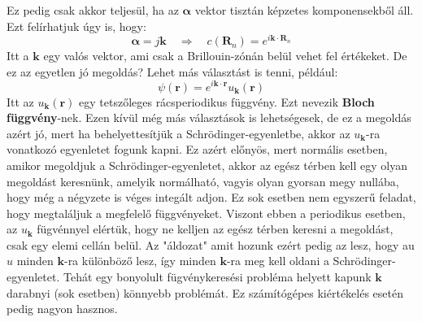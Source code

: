 \documentclass[../main.tex]{subfiles}
\begin{document}
Ez pedig csak akkor teljesül, ha az $\boldsymbol{\alpha}$ vektor tisztán képzetes komponensekből áll. Ezt felírhatjuk úgy is, hogy:
\begin{equation}
    \boldsymbol{\alpha} = j \mathbf{k} \quad \Rightarrow \quad c(\mathbf{R}_n) = e^{i \mathbf{k} \cdot \mathbf{R}_n}
\end{equation}
Itt a $\mathbf{k}$ egy valós vektor, ami csak a Brillouin-zónán belül vehet fel értékeket. De ez az egyetlen jó megoldás? Lehet más választást is tenni, például:
\begin{equation}
    \boxed{\psi (\mathbf{r}) = e^{i \mathbf{k} \cdot \mathbf{r}} u_\mathbf{k} (\mathbf{r})}
\end{equation}
Itt az $u_\mathbf{k} (\mathbf{r})$ egy tetszőleges rácsperiodikus függvény. Ezt nevezik \textbf{Bloch függvény}-nek. Ezen kívül még más választások is lehetségesek, de ez a megoldás azért jó,
mert ha behelyettesítjük a Schrödinger-egyenletbe, akkor az $u_\mathbf{k}$-ra vonatkozó egyenletet fogunk kapni. Ez azért előnyös, mert normális esetben, amikor megoldjuk a Schrödinger-egyenletet,
akkor az egész térben kell egy olyan megoldást keresnünk, amelyik normálható, vagyis olyan gyorsan megy nullába, hogy még a négyzete is véges integált adjon. Ez sok esetben nem egyszerű feladat, 
hogy megtaláljuk a megfelelő függvényeket. Viszont ebben a periodikus esetben, az $u_\mathbf{k}$ fügvénnyel elértük, hogy ne kelljen az egész térben keresni a megoldást, csak egy elemi cellán belül.
Az "áldozat" amit hozunk ezért pedig az lesz, hogy au $u$ minden $\mathbf{k}$-ra különböző lesz, így minden $\mathbf{k}$-ra meg kell oldani a Schrödinger-egyenletet. Tehát egy bonyolult fügvénykeresési probléma
helyett kapunk $\mathbf{k}$ darabnyi (sok esetben) könnyebb problémát. Ez számítógépes kiértékelés esetén pedig nagyon hasznos.
\end{document}
